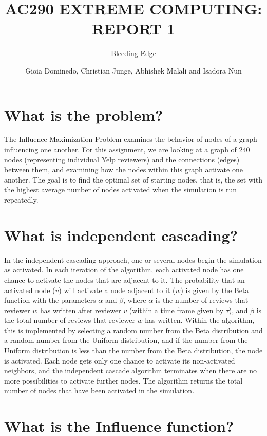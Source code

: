 \documentclass[11pt]{scrartcl} %
\title{AC290 EXTREME COMPUTING: REPORT 1}
\subtitle{Bleeding Edge}
\author{Gioia Dominedo, Christian Junge, Abhishek Malali and Isadora Nun}
\begin{document}
\maketitle

\section{What is the problem?}

The Influence Maximization Problem examines the behavior of nodes of a graph influencing one another.  For this assignment, we are looking at a graph of 240 nodes (representing individual Yelp reviewers) and the connections (edges) between them, and examining how the nodes within this graph activate one another.  The goal is to find the optimal set of starting nodes, that is, the set with the highest average number of nodes activated when the simulation is run repeatedly.  

\section{What is independent cascading?}

In the independent cascading approach, one or several nodes begin the simulation as activated.  In each iteration of the algorithm, each activated node has one chance to activate the nodes that are adjacent to it.  The probability that an activated node ($v$) will activate a node adjacent to it ($w$) is given by the Beta function with the parameters $\alpha$ and $\beta$, where $\alpha$ is the number of reviews that reviewer $w$ has written after reviewer $v$ (within a time frame given by $\tau$), and $\beta$ is the total number of reviews that reviewer $w$ has written.  Within the algorithm, this is implemented by selecting a random number from the Beta distribution and a random number from the Uniform distribution, and if the number from the Uniform distribution is less than the number from the Beta distribution, the node is activated.  Each node gets only one chance to activate its non-activated neighbors, and the independent cascade algorithm terminates when there are no more possibilities to activate further nodes.  The algorithm returns the total number of nodes that have been activated in the simulation.  

\section{What is the Influence function?}
\end{document}
